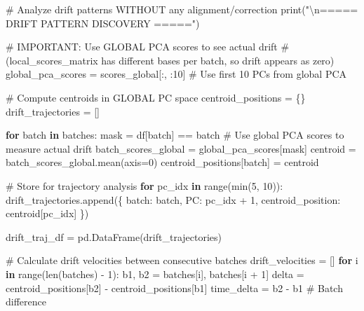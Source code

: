 \documentclass[
  letterpaper,
  DIV=11,
  numbers=noendperiod]{scrartcl}
\newenvironment{Shaded}{\begin{snugshade}}{\end{snugshade}}
\newcommand{\BuiltInTok}[1]{\textcolor[rgb]{0.00,0.23,0.31}{#1}}
\newcommand{\CharTok}[1]{\textcolor[rgb]{0.13,0.47,0.30}{#1}}
\newcommand{\CommentTok}[1]{\textcolor[rgb]{0.37,0.37,0.37}{#1}}
\newcommand{\ControlFlowTok}[1]{\textcolor[rgb]{0.00,0.23,0.31}{\textbf{#1}}}
\newcommand{\DecValTok}[1]{\textcolor[rgb]{0.68,0.00,0.00}{#1}}
\newcommand{\KeywordTok}[1]{\textcolor[rgb]{0.00,0.23,0.31}{\textbf{#1}}}
\newcommand{\NormalTok}[1]{\textcolor[rgb]{0.00,0.23,0.31}{#1}}
\newcommand{\OperatorTok}[1]{\textcolor[rgb]{0.37,0.37,0.37}{#1}}
\newcommand{\StringTok}[1]{\textcolor[rgb]{0.13,0.47,0.30}{#1}}
\renewenvironment{Shaded}{%
  \begin{tcolorbox}[%
    enhanced,%
    colback=codebg,%
    colframe=codebg,%
    borderline west={3pt}{0pt}{sectionblue},%
    fontupper=\small\ttfamily,%
    boxrule=0pt,%
    arc=0pt,%
    boxsep=5pt,%
    left=2mm,%
    right=2mm,%
    top=2mm,%
    bottom=2mm%
  ]%
}{%
  \end{tcolorbox}%
}
\begin{document}
\begin{Shaded}
\begin{Highlighting}[]
\CommentTok{\# Analyze drift patterns WITHOUT any alignment/correction}
\BuiltInTok{print}\NormalTok{(}\StringTok{"}\CharTok{\textbackslash{}n}\StringTok{===== DRIFT PATTERN DISCOVERY ====="}\NormalTok{)}

\CommentTok{\# IMPORTANT: Use GLOBAL PCA scores to see actual drift}
\CommentTok{\# (local\_scores\_matrix has different bases per batch, so drift appears as zero)}
\NormalTok{global\_pca\_scores }\OperatorTok{=}\NormalTok{ scores\_global[:, :}\DecValTok{10}\NormalTok{]  }\CommentTok{\# Use first 10 PCs from global PCA}

\CommentTok{\# Compute centroids in GLOBAL PC space}
\NormalTok{centroid\_positions }\OperatorTok{=}\NormalTok{ \{\}}
\NormalTok{drift\_trajectories }\OperatorTok{=}\NormalTok{ []}

\ControlFlowTok{for}\NormalTok{ batch }\KeywordTok{in}\NormalTok{ batches:}
\NormalTok{    mask }\OperatorTok{=}\NormalTok{ df[}\StringTok{\textquotesingle{}batch\textquotesingle{}}\NormalTok{] }\OperatorTok{==}\NormalTok{ batch}
    \CommentTok{\# Use global PCA scores to measure actual drift}
\NormalTok{    batch\_scores\_global }\OperatorTok{=}\NormalTok{ global\_pca\_scores[mask]}
\NormalTok{    centroid }\OperatorTok{=}\NormalTok{ batch\_scores\_global.mean(axis}\OperatorTok{=}\DecValTok{0}\NormalTok{)}
\NormalTok{    centroid\_positions[batch] }\OperatorTok{=}\NormalTok{ centroid}
    
    \CommentTok{\# Store for trajectory analysis}
    \ControlFlowTok{for}\NormalTok{ pc\_idx }\KeywordTok{in} \BuiltInTok{range}\NormalTok{(}\BuiltInTok{min}\NormalTok{(}\DecValTok{5}\NormalTok{, }\DecValTok{10}\NormalTok{)):}
\NormalTok{        drift\_trajectories.append(\{}
            \StringTok{\textquotesingle{}batch\textquotesingle{}}\NormalTok{: batch,}
            \StringTok{\textquotesingle{}PC\textquotesingle{}}\NormalTok{: pc\_idx }\OperatorTok{+} \DecValTok{1}\NormalTok{,}
            \StringTok{\textquotesingle{}centroid\_position\textquotesingle{}}\NormalTok{: centroid[pc\_idx]}
\NormalTok{        \})}

\NormalTok{drift\_traj\_df }\OperatorTok{=}\NormalTok{ pd.DataFrame(drift\_trajectories)}

\CommentTok{\# Calculate drift velocities between consecutive batches}
\NormalTok{drift\_velocities }\OperatorTok{=}\NormalTok{ []}
\ControlFlowTok{for}\NormalTok{ i }\KeywordTok{in} \BuiltInTok{range}\NormalTok{(}\BuiltInTok{len}\NormalTok{(batches) }\OperatorTok{{-}} \DecValTok{1}\NormalTok{):}
\NormalTok{    b1, b2 }\OperatorTok{=}\NormalTok{ batches[i], batches[i }\OperatorTok{+} \DecValTok{1}\NormalTok{]}
\NormalTok{    delta }\OperatorTok{=}\NormalTok{ centroid\_positions[b2] }\OperatorTok{{-}}\NormalTok{ centroid\_positions[b1]}
\NormalTok{    time\_delta }\OperatorTok{=}\NormalTok{ b2 }\OperatorTok{{-}}\NormalTok{ b1  }\CommentTok{\# Batch difference}
    

\end{Highlighting}
\end{Shaded}
\end{document}
